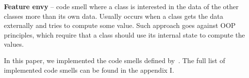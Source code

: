 \begin{flushleft}
    \textbf{Feature envy} -- code smell where a class is interested in the data of the other classes
    more than its own data.
    Usually occurs when a class gets the data externally and tries to compute some value.
    Such approach goes against OOP principles, which require that a class should use its internal state to compute the values.
\end{flushleft}

In this paper, we implemented the code smells defined by~\citeauthor{refactoring-fowler}.
The full list of implemented code smells can be found in the appendix I\@.

